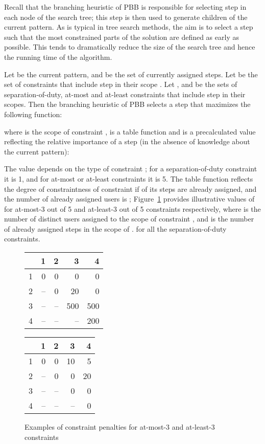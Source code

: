 \documentclass[jcs,crcready]{iosart1c}
\begin{document}
 Recall that the branching heuristic of PBB is responsible for selecting step  in each node of the search tree; this step is then used to generate children of the current pattern.
 As is typical in tree search methods, the aim is to select a step such that the most constrained parts of the solution are defined as early as possible.
 This tends to dramatically reduce the size of the search tree and hence the running time of the algorithm.
 
 Let  be the current pattern, and  be the set of currently assigned steps.
 Let  be the set of constraints that include step  in their scope .
 Let ,  and  be the sets of separation-of-duty, at-most and at-least constraints that include step  in their scopes.
 Then the branching heuristic of PBB selects a step  that maximizes the following function:
 
where  is the scope of constraint ,  is a table function and  is a precalculated value reflecting the relative importance of a step (in the absence of knowledge about the current pattern):

 The value  depends on the type of constraint ; for a separation-of-duty constraint it is 1, and for at-most or at-least constraints it is 5.
 The table function  reflects the degree of constraintness of constraint  if  of its steps are already assigned, and the number of already assigned users is ;
 Figure~\ref{fig:constraint-penalties-appendix} provides illustrative values of  for at-most-3 out of 5 and at-least-3 out of 5 constraints respectively, where  is the number of distinct users assigned to the scope of constraint , and  is the number of already assigned steps in the scope of .
 	 for all the separation-of-duty constraints.

\begin{figure}[htb]
 \centering
{
	\begin{tabular}{@{} crrrr @{}}
		\toprule
 		 & 1 & 2 & 3 & 4 \\
		\midrule
		1	&	0	&	0	&	0	&	0 \\
		2	&	--	&	0	&	20	&	0 \\
		3	&	--	&	--	&	500	&	500 \\
		4	&	--	&	--	&	--	&	200 \\
		\bottomrule
	\end{tabular}
	 }
 \qquad
{
	\begin{tabular}{@{} crrrr @{}}
		\toprule
 		 & 1 & 2 & 3 & 4 \\
		\midrule
		1	&	0	&	0	&	10	&	5 \\
		2	&	--	&	0	&	0	&	20 \\
		3	&	--	&	--	&	0	&	0 \\
		4	&	--	&	--	&	--	&	0 \\
		\bottomrule
	\end{tabular}
 }

 \caption{Examples of constraint penalties for at-most-3 and at-least-3 constraints}\label{fig:constraint-penalties-appendix}
\end{figure}
\end{document}
